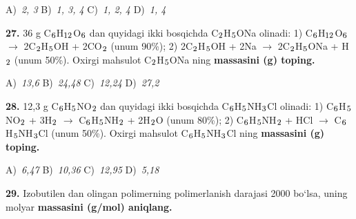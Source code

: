 \documentclass[11pt,a4paper]{article}
\renewcommand{\textsubscript}[1]{\ensuremath{_{\text{\fontsize{8}{8}\selectfont #1}}}}
\begin{document}
\begin{multicols}{2}
\noindent A)~\textsl{2, 3} \hfill B)~\textsl{1, 3, 4} \hfill C)~\textsl{1, 2, 4} \hfill D)~\textsl{1, 4}\par
\vspace{4pt}
\noindent\textbf{27.} 36 g C\textsubscript{6}H\textsubscript{12}O\textsubscript{6} dan quyidagi ikki bosqichda C\textsubscript{2}H\textsubscript{5}ONa olinadi: 1) C\textsubscript{6}H\textsubscript{12}O\textsubscript{6} $\to$ 2C\textsubscript{2}H\textsubscript{5}OH + 2CO\textsubscript{2} (unum 90\%); 2) 2C\textsubscript{2}H\textsubscript{5}OH + 2Na $\to$ 2C\textsubscript{2}H\textsubscript{5}ONa + H\textsubscript{2} (unum 50\%). Oxirgi mahsulot C\textsubscript{2}H\textsubscript{5}ONa ning \textbf{massasini (g) toping.}

\noindent A)~\textsl{13,6} \hfill B)~\textsl{24,48} \hfill C)~\textsl{12,24} \hfill D)~\textsl{27,2}\par
\vspace{4pt}
\noindent\textbf{28.} 12,3 g C\textsubscript{6}H\textsubscript{5}NO\textsubscript{2} dan quyidagi ikki bosqichda C\textsubscript{6}H\textsubscript{5}NH\textsubscript{3}Cl olinadi: 1) C\textsubscript{6}H\textsubscript{5}NO\textsubscript{2} + 3H\textsubscript{2} $\to$ C\textsubscript{6}H\textsubscript{5}NH\textsubscript{2} + 2H\textsubscript{2}O (unum 80\%); 2) C\textsubscript{6}H\textsubscript{5}NH\textsubscript{2} + HCl $\to$ C\textsubscript{6}H\textsubscript{5}NH\textsubscript{3}Cl (unum 50\%). Oxirgi mahsulot C\textsubscript{6}H\textsubscript{5}NH\textsubscript{3}Cl ning \textbf{massasini (g) toping.}

\noindent A)~\textsl{6,47} \hfill B)~\textsl{10,36} \hfill C)~\textsl{12,95} \hfill D)~\textsl{5,18}\par
\vspace{4pt}
\noindent\textbf{29.} Izobutilen dan olingan polimerning polimerlanish darajasi 2000 bo`lsa, uning molyar \textbf{massasini (g/mol) aniqlang.}


\end{multicols}
\end{document}
